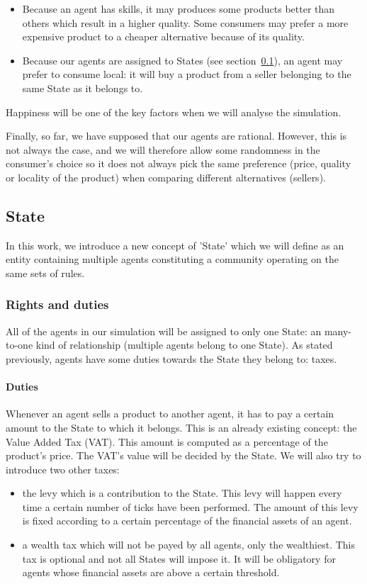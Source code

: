 \begin{itemize}
    \item Because an agent has skills, it may produces some products better than others which result in a higher quality. Some consumers may prefer a more expensive product to a cheaper alternative because of its quality.
    \item Because our agents are assigned to States (see section~\ref{section:state}), an agent may prefer to consume local: it will buy a product from a seller belonging to the same State as it belongs to.
\end{itemize}

Happiness will be one of the key factors when we will analyse the simulation.

Finally, so far, we have supposed that our agents are rational. However, this is not always the case, and we will therefore allow some randomness in the consumer's choice so it does not always pick the same preference (price, quality or locality of the product) when comparing different alternatives (sellers).

\subsection{State}\label{section:state}
In this work, we introduce a new concept of 'State' which we will define as an entity containing multiple agents constituting a community operating on the same sets of rules.

\subsubsection{Rights and duties}
All of the agents in our simulation will be assigned to only one State: an many-to-one kind of relationship (multiple agents belong to one State). As stated previously, agents have some duties towards the State they belong to: taxes.

\paragraph{Duties}
Whenever an agent sells a product to another agent, it has to pay a certain amount to the State to which it belongs. This is an already existing concept: the Value Added Tax (VAT). This amount is computed as a percentage of the product's price. The VAT's value will be decided by the State. We will also try to introduce two other taxes:

\begin{itemize}
    \item the levy which is a contribution to the State. This levy will happen every time a certain number of ticks have been performed. The amount of this levy is fixed according to a certain percentage of the financial assets of an agent.
    \item a wealth tax which will not be payed by all agents, only the wealthiest. This tax is optional and not all States will impose it. It will be obligatory for agents whose financial assets are above a certain threshold.
\end{itemize}

